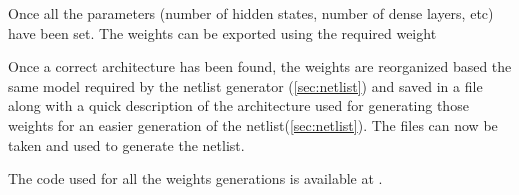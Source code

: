 Once all the parameters (number of hidden states, number of dense layers, etc) have been set. The weights can be exported using the required weight

Once a correct architecture has been found, the weights are reorganized based the same model required by the netlist generator (\cref{sec:netlist}) and saved in a file along with a quick description of the architecture used for generating those weights for an easier generation of the netlist(\cref{sec:netlist}). The files can now be taken and used to generate the netlist.

The code used for all the weights generations is available at \cite{lstmWei}. %
